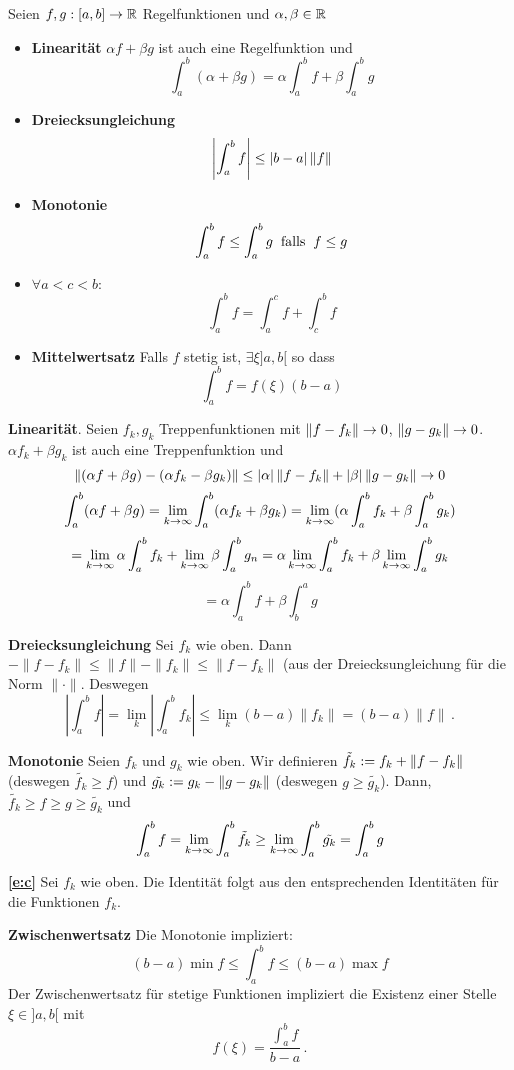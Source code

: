 \begin{theorem}
  Seien $f,g:[a,b]\to\mathbb{R}$ Regelfunktionen und $\alpha,\beta\in\mathbb{R}$
  \begin{itemize}
    \item {\bf Linearität} $\alpha f + \beta g$ ist auch eine Regelfunktion und
      \[\int_a^b(\alpha + \beta g)=\alpha\int_a^bf+\beta\int_a^bg\]
    \item {\bf Dreiecksungleichung} 
      \[\left|\int_a^bf\right|\leq\mathopen| b-a \mathclose|\left\| f \right\|\]
    \item {\bf Monotonie}
      \[\int_a^bf\leq\int_a^bg\hspace{2mm}\text{falls}\hspace{2mm} f\leq g\]
    \item $\forall a<c<b$:
\begin{equation}\label{e:c}
\int_a^bf=\int_a^cf+\int_c^bf
\end{equation}
\item {\bf Mittelwertsatz}
      Falls $f$ stetig ist, $\exists\xi ]a,b[$ so dass
      \[\int_a^bf=f(\xi)(b-a)\]
  \end{itemize}
\end{theorem}
\begin{Bew} {\bf Linearit\"at}. Seien $f_k, g_k$ Treppenfunktionen mit $\left\| f-f_k \right\| \to 0$, $\left\| g-g_k \right\|\to 0$. $\alpha f_k+\beta g_k$ ist auch eine Treppenfunktion und
      \[\left\| (\alpha f+\beta g)-(\alpha f_k-\beta g_k) \right\|\leq\mathopen| \alpha \mathclose|\left\| f-f_k \right\|+\mathopen| \beta \mathclose|\left\| g-g_k \right\|\to 0\]
      \[\int_a^b(\alpha f+\beta g)=\displaystyle\lim_{k\rightarrow\infty}\int_a^b(\alpha f_k+\beta g_k)=\displaystyle\lim_{k\rightarrow\infty}(\alpha \int_a^bf_k+\beta\int_a^b g_k)\]
      \[=\displaystyle\lim_{k\rightarrow\infty}\alpha\int_a^b f_k+\displaystyle\lim_{k\rightarrow\infty}\beta\int_a^b g_n=\alpha\displaystyle\lim_{k\rightarrow\infty}\int_a^b f_k+\beta\displaystyle\lim_{k\rightarrow\infty}\int_a^bg_k\]
      \[=\alpha\int_a^b f+\beta\int^a_b g\]

\medskip

{\bf Dreiecksungleichung} Sei $f_k$ wie oben. Dann $ - \|f-f_k\| \leq \|f\|-\|f_k\| \leq \|f-f_k\|$
(aus der Dreiecksungleichung f\"ur die Norm $\|\cdot\|$. Deswegen
\[
\left|\int_a^b f\right|= \lim_k \left|\int_a^b f_k\right|
\leq \lim_k (b-a) \|f_k\| = (b-a)\|f\|\, .
\]

\medskip

{\bf Monotonie} Seien $f_k$ und $g_k$ wie oben. Wir definieren $\tilde{f_k}:=f_k+\left\| f-f_k \right\|$ 
(deswegen $\tilde{f_k}\geq f$) und $\tilde{g_k}:=g_k-\left\| g-g_k \right\|$ (deswegen $g\geq\tilde{g_k}$). 
Dann, $\tilde{f_k}\geq f \geq g \geq \tilde{g_k}$ und
    \[\int_a^bf=\displaystyle\lim_{k\rightarrow\infty}\int_a^b\tilde{f_k}\geq\displaystyle\lim_{k\rightarrow\infty}\int_a^b\tilde{g_k}=\int_a^bg\]

\medskip

{\bf \eqref{e:c}} Sei $f_k$ wie oben. Die Identit\"at folgt aus den entsprechenden Identit\"aten
f\"ur die Funktionen $f_k$.

\medskip

{\bf Zwischenwertsatz} Die Monotonie impliziert:
\[(b-a)\min f\leq \int_a^b f\leq(b-a)\max f\]
Der Zwischenwertsatz f\"ur stetige Funktionen impliziert die Existenz einer Stelle $\xi\in ]a,b[$ mit 
\[
f(\xi)=\frac{\int_a^bf}{b-a}\, .
\]
\end{Bew}
